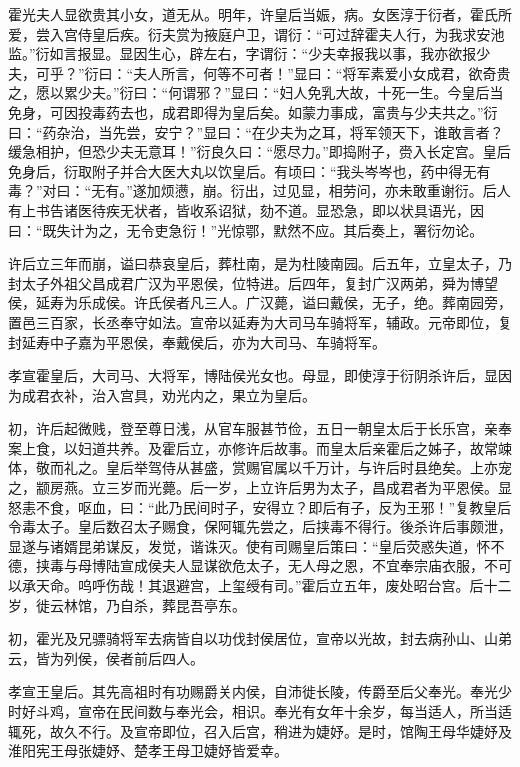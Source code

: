 \documentclass[12pt,UTF8]{ctexbook}
\begin{document}
霍光夫人显欲贵其小女，道无从。明年，许皇后当娠，病。女医淳于衍者，霍氏所爱，尝入宫侍皇后疾。衍夫赏为掖庭户卫，谓衍：“可过辞霍夫人行，为我求安池监。”衍如言报显。显因生心，辟左右，字谓衍：“少夫幸报我以事，我亦欲报少夫，可乎？”衍曰：“夫人所言，何等不可者！”显曰：“将军素爱小女成君，欲奇贵之，愿以累少夫。”衍曰：“何谓邪？”显曰：“妇人免乳大故，十死一生。今皇后当免身，可因投毒药去也，成君即得为皇后矣。如蒙力事成，富贵与少夫共之。”衍曰：“药杂治，当先尝，安宁？”显曰：“在少夫为之耳，将军领天下，谁敢言者？缓急相护，但恐少夫无意耳！”衍良久曰：“愿尽力。”即捣附子，赍入长定宫。皇后免身后，衍取附子并合大医大丸以饮皇后。有顷曰：“我头岑岑也，药中得无有毒？”对曰：“无有。”遂加烦懑，崩。衍出，过见显，相劳问，亦未敢重谢衍。后人有上书告诸医待疾无状者，皆收系诏狱，劾不道。显恐急，即以状具语光，因曰：“既失计为之，无令吏急衍！”光惊鄂，默然不应。其后奏上，署衍勿论。



许后立三年而崩，谥曰恭哀皇后，葬杜南，是为杜陵南园。后五年，立皇太子，乃封太子外祖父昌成君广汉为平恩侯，位特进。后四年，复封广汉两弟，舜为博望侯，延寿为乐成侯。许氏侯者凡三人。广汉薨，谥曰戴侯，无子，绝。葬南园旁，置邑三百家，长丞奉守如法。宣帝以延寿为大司马车骑将军，辅政。元帝即位，复封延寿中子嘉为平恩侯，奉戴侯后，亦为大司马、车骑将军。



孝宣霍皇后，大司马、大将军，博陆侯光女也。母显，即使淳于衍阴杀许后，显因为成君衣补，治入宫具，劝光内之，果立为皇后。



初，许后起微贱，登至尊日浅，从官车服甚节俭，五日一朝皇太后于长乐宫，亲奉案上食，以妇道共养。及霍后立，亦修许后故事。而皇太后亲霍后之姊子，故常竦体，敬而礼之。皇后举驾侍从甚盛，赏赐官属以千万计，与许后时县绝矣。上亦宠之，颛房燕。立三岁而光薨。后一岁，上立许后男为太子，昌成君者为平恩侯。显怒恚不食，呕血，曰：“此乃民间时子，安得立？即后有子，反为王邪！”复教皇后令毒太子。皇后数召太子赐食，保阿辄先尝之，后挟毒不得行。後杀许后事颇泄，显遂与诸婿昆弟谋反，发觉，谐诛灭。使有司赐皇后策曰：“皇后荧惑失道，怀不德，挟毒与母博陆宣成侯夫人显谋欲危太子，无人母之恩，不宜奉宗庙衣服，不可以承天命。呜呼伤哉！其退避宫，上玺绶有司。”霍后立五年，废处昭台宫。后十二岁，徙云林馆，乃自杀，葬昆吾亭东。



初，霍光及兄骠骑将军去病皆自以功伐封侯居位，宣帝以光故，封去病孙山、山弟云，皆为列侯，侯者前后四人。



孝宣王皇后。其先高祖时有功赐爵关内侯，自沛徙长陵，传爵至后父奉光。奉光少时好斗鸡，宣帝在民间数与奉光会，相识。奉光有女年十余岁，每当适人，所当适辄死，故久不行。及宣帝即位，召入后宫，稍进为婕妤。是时，馆陶王母华婕妤及淮阳宪王母张婕妤、楚孝王母卫婕妤皆爱幸。
\end{document}

